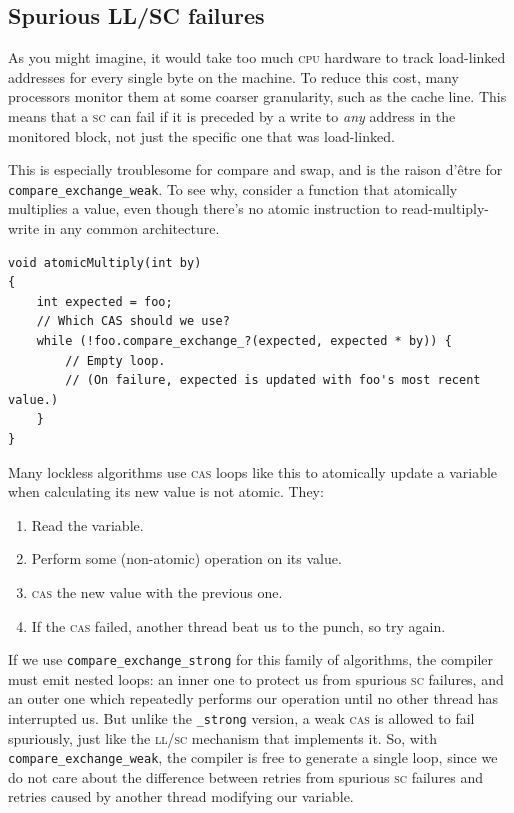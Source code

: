 \documentclass[fontsize=10pt, oneside]{scrartcl}
\newcommand{\codesize}{\fontsize{\bodyfontsize}{\bodybaselineskip}}
\newcommand{\monobox}[1]{\mbox{\texttt{#1}}}
\newenvironment{colfigure}
  {\par\vspace{1\baselineskip minus 0.5\baselineskip}\noindent\minipage{\linewidth}}
  {\endminipage\vspace{1\baselineskip minus 0.7\baselineskip}}
\begin{document}
\subsection{Spurious LL/SC failures}
\label{spurious-ll/sc-failures}

As you might imagine, it would take too much \textsc{cpu} hardware to track load-linked addresses for every single byte on the machine.
To reduce this cost, many processors monitor them at some coarser granularity,
such as the cache line.
This means that a \textsc{sc} can fail if it is preceded by a write to \emph{any} address in the monitored block,
not just the specific one that was load-linked.

This is especially troublesome for compare and swap,
and is the raison d'être for \monobox{compare\_exchange\_weak}.
To see why, consider a function that atomically multiplies a value,
even though there's no atomic instruction to read-multiply-write in any common architecture.
\begin{colfigure}
\begin{verbatim}
void atomicMultiply(int by)
{
    int expected = foo;
    // Which CAS should we use?
    while (!foo.compare_exchange_?(expected, expected * by)) {
        // Empty loop.
        // (On failure, expected is updated with foo's most recent value.)
    }
}
\end{verbatim}
\end{colfigure}
Many lockless algorithms use \textsc{cas} loops like this to atomically update a variable when calculating its new value is not atomic.
They:
\begin{enumerate}
\item Read the variable.
\item Perform some (non-atomic) operation on its value.
\item \textsc{cas} the new value with the previous one.
\item If the \textsc{cas} failed, another thread beat us to the punch, so try again.
\end{enumerate}
If we use \monobox{compare\_exchange\_strong} for this family of algorithms,
the compiler must emit nested loops:
an inner one to protect us from spurious \textsc{sc} failures,
and an outer one which repeatedly performs our operation until no other thread has interrupted us.
But unlike the \monobox{\_strong} version,
a weak \textsc{cas} is allowed to fail spuriously, just like the \textsc{ll/sc} mechanism that implements it.
So, with \monobox{compare\_exchange\_weak},
the compiler is free to generate a single loop,
since we do not care about the difference between retries from spurious \textsc{sc} failures and retries caused by another thread modifying our variable.
\end{document}
